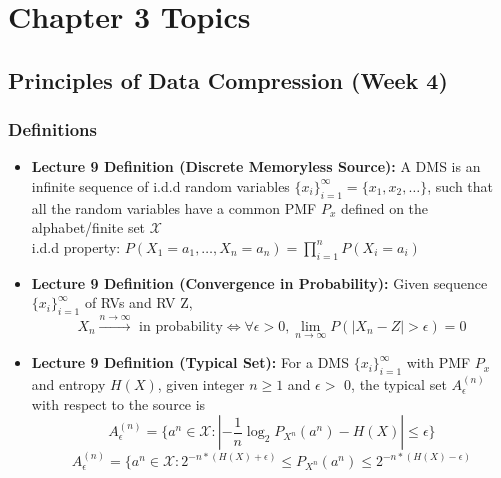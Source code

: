 \documentclass{article}
\begin{document}
\section{Chapter 3 Topics}
\subsection{Principles of Data Compression (Week 4)}
\subsubsection{Definitions}
\begin{itemize}
    \item \textbf{Lecture 9 Definition (Discrete Memoryless Source):}
    A DMS is an infinite sequence of i.d.d random variables \(\{x_{i}\}^\infty_{i=1} = \{x_1, x_2, \ldots\}\), such that all the random variables have a common PMF \(P_x\) defined on the alphabet/finite set \(\mathcal{X}\)
\\ i.d.d property: \(P(X_1 = a_1, \ldots, X_n = a_n) = \prod_{i=1}^n P(X_i=a_i)\)
    \item \textbf{Lecture 9 Definition (Convergence in Probability):} Given sequence \(\{x_i\}^\infty_{i=1}\) of RVs and RV Z,
    \[X_n \xrightarrow[]{n\to\infty} \text{ in probability} \Longleftrightarrow \forall \epsilon > 0, \lim_{n\to\infty} P(|X_n-Z|>\epsilon)=0\]    
    
    \item \textbf{Lecture 9 Definition (Typical Set):} For a DMS \(\{x_i\}^\infty_{i=1}\) with PMF \(P_x\) and entropy \(H(X)\), given integer \(n \geq 1\)
    and \(\epsilon >\) 0, the typical set \(A_\epsilon^{(n)}\) with respect to the source is
    \[A^{(n)}_\epsilon = \{a^n \in \mathcal{X}: \left |-\frac{1}{n} \log_2 P_{X^n}(a^n) - H(X) \right|\leq\epsilon\}\]
    \[A^{(n)}_\epsilon = \{a^n \in \mathcal{X}: 2^{-n*(H(X) + \epsilon)} \leq P_{X^n}(a^n) \leq 2^{-n*(H(X) - \epsilon)}\]



\end{itemize}
\end{document}
